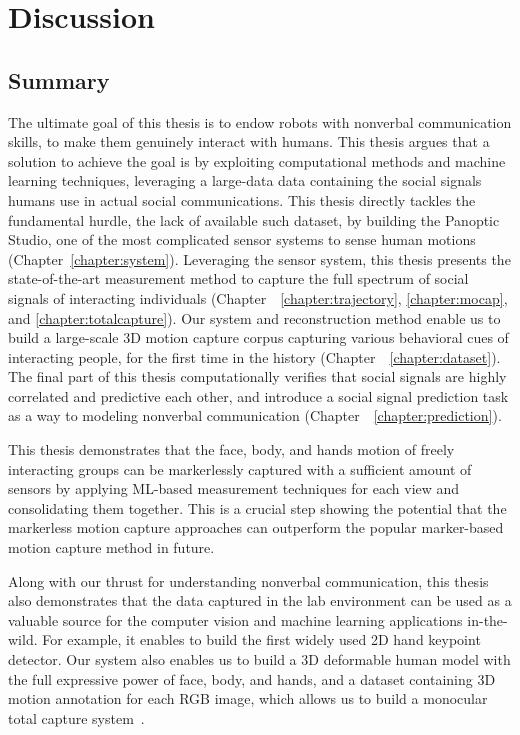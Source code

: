 
\chapter{Discussion}
\label{chapter:discussion}

\section{Summary}

The ultimate goal of this thesis is to endow robots with nonverbal communication skills, to make them genuinely interact with humans. This thesis argues that a solution to achieve the goal is by exploiting computational methods and machine learning techniques, leveraging a large-data data containing the social signals humans use in actual social communications. This thesis directly tackles the fundamental hurdle, the lack of available such dataset, by building the Panoptic Studio, one of the most complicated sensor systems to sense human motions (Chapter~\ref{chapter:system}). Leveraging the sensor system, this thesis presents the state-of-the-art measurement method to capture the full spectrum of social signals of interacting individuals (Chapter~~\ref{chapter:trajectory}, \ref{chapter:mocap}, and  \ref{chapter:totalcapture}). Our system and reconstruction method enable us to build a large-scale 3D motion capture corpus capturing various behavioral cues of interacting people, for the first time in the history (Chapter~~\ref{chapter:dataset}). The final part of this thesis computationally verifies that social signals are highly correlated and predictive each other, and introduce a social signal prediction task as a way to modeling nonverbal communication (Chapter~~\ref{chapter:prediction}).

This thesis demonstrates that the face, body, and hands motion of freely interacting groups can be markerlessly captured with a sufficient amount of sensors by applying ML-based measurement techniques for each view and consolidating them together. This is a crucial step showing the potential that the markerless motion capture approaches can outperform the popular marker-based motion capture method in future. 

Along with our thrust for understanding nonverbal communication, this thesis also demonstrates that the data captured in the lab environment can be used as a valuable source for the computer vision and machine learning applications in-the-wild. For example, it enables to build the first widely used 2D hand keypoint detector\cite{simon2017hand}. Our system also enables us to build a 3D deformable human model with the full expressive power of face, body, and hands, and a dataset containing 3D motion annotation for each RGB image, which allows us to build a monocular total capture system~\cite{Xiang2019}. 

